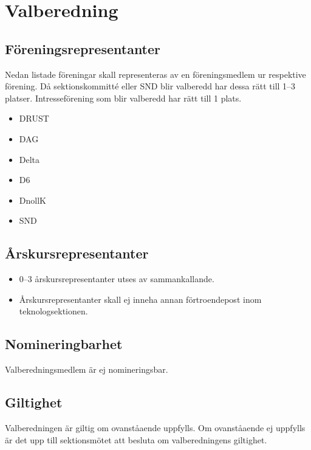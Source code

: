 \section{Valberedning}
\subsection{Föreningsrepresentanter}
Nedan listade föreningar skall representeras av en föreningsmedlem ur respektive förening. Då sektionskommitté eller SND blir valberedd har dessa rätt till 1--3 platser. Intresseförening som blir valberedd har rätt till 1 plats. 
\begin{itemize}
  \item DRUST 
  \item DAG 
  \item Delta 
  \item D6 
  \item DnollK 
  \item SND 
\end{itemize}
\subsection{Årskursrepresentanter}
\begin{itemize}
  \item 0--3 årskursrepresentanter utses av sammankallande. 
  \item Årskursrepresentanter skall ej inneha annan förtroendepost inom teknologsektionen. 
\end{itemize}
\subsection{Nomineringbarhet}
Valberedningsmedlem är ej nomineringsbar.
\subsection{Giltighet}
Valberedningen är giltig om ovanståaende uppfylls. Om ovanståaende ej uppfylls är det upp till sektionsmötet att besluta om valberedningens giltighet.
